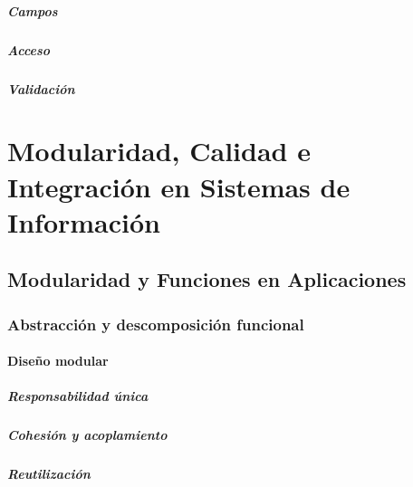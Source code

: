 \documentclass[12pt,twoside]{book}
\begin{document}
	\subsubsection{Campos}
	
	\subsubsection{Acceso}
	
	\subsubsection{Validación}
	
	\part{Modularidad, Calidad e Integración en Sistemas de Información}
	
	\chapter{Modularidad y Funciones en Aplicaciones}
	
	\section{Abstracción y descomposición funcional}
	
	\subsection{Diseño modular}
	
	\subsubsection{Responsabilidad única}
	
	\subsubsection{Cohesión y acoplamiento}
	
	\subsubsection{Reutilización}
	
\end{document}
